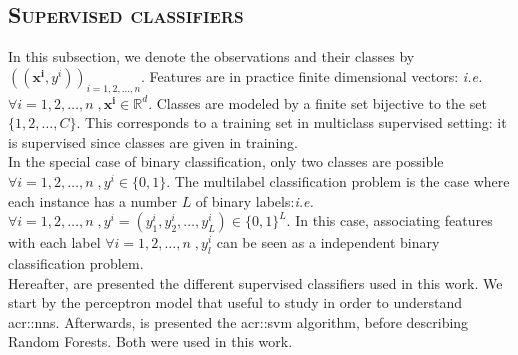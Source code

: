     \subsection{\textsc{Supervised classifiers}}
        \label{subsec::state_of_the_art::mlpr::classifiers}
        In this subsection, we denote the observations and their classes by $\left((\bm{x^i}, y^i)\right)_{i=1,2,\dots,n}$.
        Features are in practice finite dimensional vectors: \textit{i.e.} $\forall i=1,2,\dots,n \;, \bm{x^i} \in \mathbb{R}^d$.
        Classes are modeled by a finite set bijective to the set $\{1,2,\dots,C\}$.
        This corresponds to a training set in multiclass supervised setting: it is supervised since classes are given in training.\\

        In the special case of binary classification, only two classes are possible $\forall i=1,2,\dots,n \;,\allowbreak y^i \in \{0, 1\}$.
        The multilabel classification problem is the case where each instance has a number $L$ of binary labels:\textit{i.e.} $\forall i=1,2,\dots,n \;, y^i = (y^i_1, y^i_2, \dots, y^i_L) \in \{0, 1\}^L$.
        In this case, associating features with each label $\forall i=1,2,\dots,n \;, y^i_l$ can be seen as a independent binary classification problem.\\

        Hereafter, are presented the different supervised classifiers used in this work.
        We start by the perceptron model that useful to study in order to understand \glspl{acr::nn}.
        Afterwards, is presented the \gls{acr::svm} algorithm, before describing Random Forests.
        Both were used in this work.
